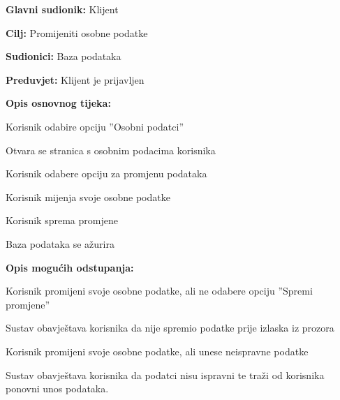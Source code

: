 \noindent {}
\begin{packed_item}
	
	\item \textbf{Glavni sudionik: }Klijent
	\item  \textbf{Cilj:} Promijeniti osobne podatke
	\item  \textbf{Sudionici:} Baza podataka
	\item  \textbf{Preduvjet:} Klijent je prijavljen
	\item  \textbf{Opis osnovnog tijeka:}
	
	\item[] \begin{packed_enum}
		
		\item Korisnik odabire opciju ”Osobni podatci”
		\item Otvara se stranica s osobnim podacima korisnika
		\item Korisnik odabere opciju za promjenu podataka
		\item Korisnik mijenja svoje osobne podatke
		\item Korisnik sprema promjene
		\item Baza podataka se ažurira
		
	\end{packed_enum}
	
	\item  \textbf{Opis mogućih odstupanja:}
	
	\item[] \begin{packed_item}
		
		\item[2.a] Korisnik promijeni svoje osobne podatke, ali ne odabere opciju ”Spremi promjene”
		
		\item[] \begin{packed_enum}
			
			\item Sustav obavještava korisnika da nije spremio podatke prije izlaska iz prozora
			
			
		\end{packed_enum}
		
		\item[4.a] Korisnik promijeni svoje osobne podatke, ali unese neispravne podatke
		\item[] \begin{packed_enum}
			
			\item Sustav obavještava korisnika da podatci nisu ispravni te traži od korisnika ponovni unos podataka.
			

\end{packed_enum}
\end{packed_item}
\end{packed_item}
